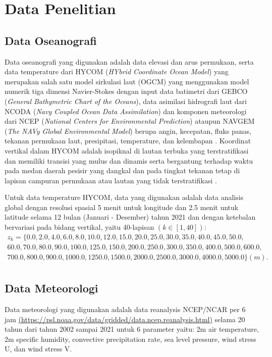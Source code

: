 \section[Data Penelitian]{Data Penelitian}
\begin{spacing}{1.5}
\vspace{-1pc}
\subsection[Data Oseanografi]{Data Oseanografi}
	Data oseanografi yang digunakan adalah data elevasi dan arus permukaan, serta data temperature dari HYCOM (\textit{HYbrid Coordinate Ocean Model}) yang merupakan salah satu model sirkulasi laut (OGCM) yang menggunakan model numerik tiga dimensi Navier-Stokes dengan input data batimetri dari GEBCO (\textit{General Bathymetric Chart of the Oceans}), data asimilasi hidrografi laut dari NCODA (\textit{Navy Coupled Ocean Data Assimilation}) dan komponen meteorologi dari NCEP (\textit{National Centers for Environmental Prediction}) ataupun NAVGEM (\textit{The NAVy Global Environmental Model}) berupa angin, kecepatan, fluks panas, tekanan permukaan laut, presipitasi, temperature, dan kelembapan . Koordinat vertikal dalam HYCOM adalah isopiknal di lautan terbuka yang terstratifikasi dan memiliki transisi yang mulus dan dinamis serta bergantung terhadap waktu pada medan daerah pesisir yang dangkal dan pada tingkat tekanan tetap di lapisan campuran permukaan atau lautan yang tidak terstratifikasi . 
	\par Untuk data temperature HYCOM, data yang digunakan adalah data analisis global dengan resolusi spasial 5 menit untuk longitude dan 2.5 menit untuk latitude selama 12 bulan (Januari - Desember) tahun 2021 dan dengan ketebalan bervariasi pada bidang vertikal, yaitu 40-lapisan $(k \in [1,40])$:
	\begin{equation*}
		\begin{aligned}
			z_k = \{0.0, 2.0, 4.0, 6.0, 8.0, 10.0, 12.0, 15.0, 20.0, 25.0, 30.0, 35.0, 40.0, 45.0, 50.0, \\
			60.0, 70.0,	80.0, 90.0, 100.0, 125.0, 150.0, 200.0, 250.0, 300.0, 350.0, 400.0, 500.0, 600.0,\\
			700.0, 800.0, 900.0, 1000.0, 1250.0, 1500.0, 2000.0, 2500.0, 3000.0, 4000.0, 5000.0\} (m). \\
		\end{aligned}
	\end{equation*}
\subsection[Data Meteorologi]{Data Meteorologi}
	Data meteorologi yang digunakan adalah data reanalysis NCEP/NCAR per 6 jam \href{https://psl.noaa.gov/data/gridded/data.ncep.reanalysis.html}{(https://psl.noaa.gov/data/gridded/data.ncep.reanalysis.html)} selama 20 tahun dari tahun 2002 sampai 2021 untuk 6 parameter yaitu: 2m air temperature, 2m specific humidity, convective precipitation rate, sea level pressure, wind stress U, dan wind stress V.
\end{spacing}
\vspace{-0.5pc}
